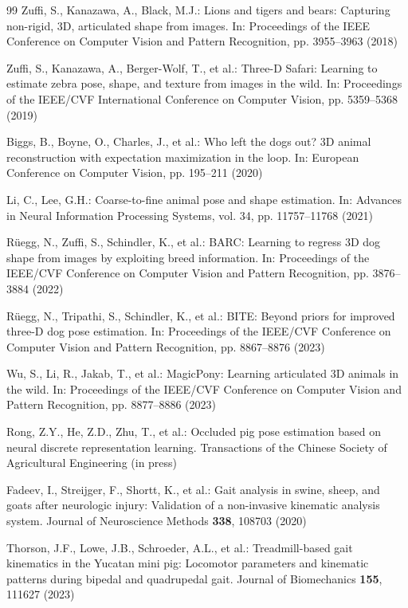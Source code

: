 \documentclass[runningheads]{llncs}
\begin{document}
\begin{thebibliography}{99}
Zuffi, S., Kanazawa, A., Black, M.J.: Lions and tigers and bears: Capturing non-rigid, 3D, articulated shape from images. In: Proceedings of the IEEE Conference on Computer Vision and Pattern Recognition, pp. 3955--3963 (2018)

Zuffi, S., Kanazawa, A., Berger-Wolf, T., et al.: Three-D Safari: Learning to estimate zebra pose, shape, and texture from images in the wild. In: Proceedings of the IEEE/CVF International Conference on Computer Vision, pp. 5359--5368 (2019)

Biggs, B., Boyne, O., Charles, J., et al.: Who left the dogs out? 3D animal reconstruction with expectation maximization in the loop. In: European Conference on Computer Vision, pp. 195--211 (2020)

Li, C., Lee, G.H.: Coarse-to-fine animal pose and shape estimation. In: Advances in Neural Information Processing Systems, vol. 34, pp. 11757--11768 (2021)

Rüegg, N., Zuffi, S., Schindler, K., et al.: BARC: Learning to regress 3D dog shape from images by exploiting breed information. In: Proceedings of the IEEE/CVF Conference on Computer Vision and Pattern Recognition, pp. 3876--3884 (2022)

Rüegg, N., Tripathi, S., Schindler, K., et al.: BITE: Beyond priors for improved three-D dog pose estimation. In: Proceedings of the IEEE/CVF Conference on Computer Vision and Pattern Recognition, pp. 8867--8876 (2023)

Wu, S., Li, R., Jakab, T., et al.: MagicPony: Learning articulated 3D animals in the wild. In: Proceedings of the IEEE/CVF Conference on Computer Vision and Pattern Recognition, pp. 8877--8886 (2023)

Rong, Z.Y., He, Z.D., Zhu, T., et al.: Occluded pig pose estimation based on neural discrete representation learning. Transactions of the Chinese Society of Agricultural Engineering (in press)

Fadeev, I., Streijger, F., Shortt, K., et al.: Gait analysis in swine, sheep, and goats after neurologic injury: Validation of a non-invasive kinematic analysis system. Journal of Neuroscience Methods \textbf{338}, 108703 (2020)

Thorson, J.F., Lowe, J.B., Schroeder, A.L., et al.: Treadmill-based gait kinematics in the Yucatan mini pig: Locomotor parameters and kinematic patterns during bipedal and quadrupedal gait. Journal of Biomechanics \textbf{155}, 111627 (2023)


\end{thebibliography}
\end{document}
